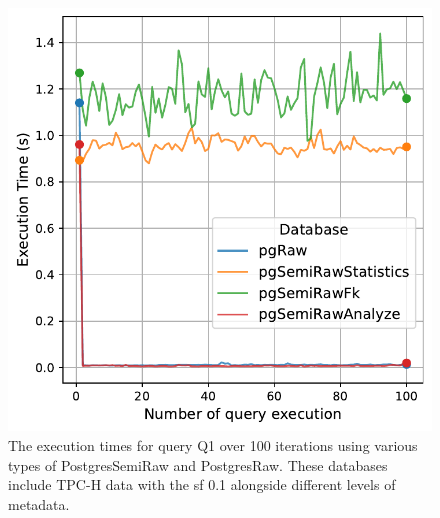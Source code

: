 \begin{figure}[hbt!]
\centering
\includegraphics[width=1.0\linewidth]{charts-eval-exp-time-stat/execution_time_db_type_Q1.pdf}
\caption[Q1:result]{The execution times for query Q1 over 100 iterations using various types of PostgresSemiRaw and PostgresRaw. These databases include TPC-H data with the \acrshort{sf} 0.1 alongside different levels of metadata.}
\label{fig:execution_time_db_type_Q1}
\end{figure}
